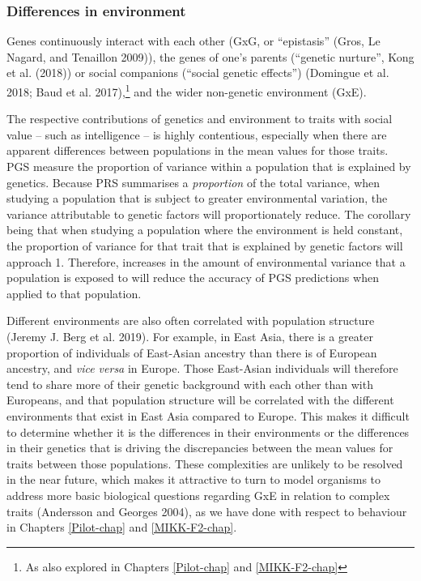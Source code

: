 \documentclass[
]{book}
\begin{document}
\hypertarget{fst-env-sec}{%
\subsubsection{Differences in environment}\label{fst-env-sec}}

Genes continuously interact with each other (GxG, or ``epistasis'' (Gros, Le Nagard, and Tenaillon 2009)), the genes of one's parents (``genetic nurture'', Kong et al. (2018)) or social companions (``social genetic effects'') (Domingue et al. 2018; Baud et al. 2017),\footnote{As also explored in Chapters \ref{Pilot-chap} and \ref{MIKK-F2-chap}} and the wider non-genetic environment (GxE).

The respective contributions of genetics and environment to traits with social value -- such as intelligence -- is highly contentious, especially when there are apparent differences between populations in the mean values for those traits. PGS measure the proportion of variance within a population that is explained by genetics. Because PRS summarises a \emph{proportion} of the total variance, when studying a population that is subject to greater environmental variation, the variance attributable to genetic factors will proportionately reduce. The corollary being that when studying a population where the environment is held constant, the proportion of variance for that trait that is explained by genetic factors will approach 1. Therefore, increases in the amount of environmental variance that a population is exposed to will reduce the accuracy of PGS predictions when applied to that population.

Different environments are also often correlated with population structure (Jeremy J. Berg et al. 2019). For example, in East Asia, there is a greater proportion of individuals of East-Asian ancestry than there is of European ancestry, and \emph{vice versa} in Europe. Those East-Asian individuals will therefore tend to share more of their genetic background with each other than with Europeans, and that population structure will be correlated with the different environments that exist in East Asia compared to Europe. This makes it difficult to determine whether it is the differences in their environments or the differences in their genetics that is driving the discrepancies between the mean values for traits between those populations. These complexities are unlikely to be resolved in the near future, which makes it attractive to turn to model organisms to address more basic biological questions regarding GxE in relation to complex traits (Andersson and Georges 2004), as we have done with respect to behaviour in Chapters \ref{Pilot-chap} and \ref{MIKK-F2-chap}.
\end{document}

